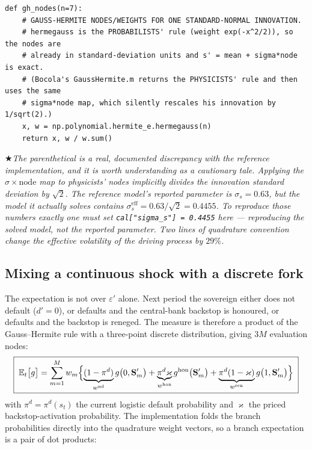 \documentclass[11pt]{article}
\numberwithin{equation}{section}
\newcommand{\E}{\mathbb{E}}
\newcommand{\code}[1]{\texttt{\small #1}}
\newcommand{\bS}{\mathbf{S}}
\theoremstyle{definition}
\theoremstyle{plain}
\theoremstyle{remark}
\newcommand{\warn}[1]{\par\smallskip\noindent
  \textcolor{red!60!black}{$\bigstar$}\;\emph{#1}\par\smallskip}
\begin{document}
\begin{lstlisting}[caption={Quadrature nodes. \code{point\_map.py}, \code{gh\_nodes}.}]
def gh_nodes(n=7):
    # GAUSS-HERMITE NODES/WEIGHTS FOR ONE STANDARD-NORMAL INNOVATION.
    # hermegauss is the PROBABILISTS' rule (weight exp(-x^2/2)), so the nodes are
    # already in standard-deviation units and s' = mean + sigma*node is exact.
    # (Bocola's GaussHermite.m returns the PHYSICISTS' rule and then uses the same
    # sigma*node map, which silently rescales his innovation by 1/sqrt(2).)
    x, w = np.polynomial.hermite_e.hermegauss(n)
    return x, w / w.sum()
\end{lstlisting}

\warn{The parenthetical is a real, documented discrepancy with the reference
implementation, and it is worth understanding as a cautionary tale. Applying the
$\sigma\times\text{node}$ map to physicists' nodes implicitly divides the innovation
standard deviation by $\sqrt2$. The reference model's \emph{reported} parameter is
$\sigma_s=0.63$, but the model it actually solves contains
$\sigma_s^{\text{eff}}=0.63/\sqrt2=0.4455$. To reproduce those numbers exactly one
must set \code{cal["sigma\_s"] = 0.4455} here --- reproducing the solved model, not
the reported parameter. Two lines of quadrature convention change the effective
volatility of the driving process by $29\%$.}

\subsection{Mixing a continuous shock with a discrete fork}

The expectation is not over $\varepsilon'$ alone. Next period the sovereign either
does not default ($d'=0$), or defaults and the central-bank backstop is honoured, or
defaults and the backstop is reneged. The measure is therefore a product of the
Gauss--Hermite rule with a three-point discrete distribution, giving $3M$ evaluation
nodes:
\begin{equation}
\boxed{\;
\E_t\bigl[g\bigr]=\sum_{m=1}^{M}w_m
\Bigl\{\underbrace{(1-\pi^{d})}_{w^{\rm nd}}g\bigl(0,\bS'_m\bigr)
+\underbrace{\pi^{d}\varkappa}_{w^{\rm hon}}g^{\rm hon}\bigl(\bS'_m\bigr)
+\underbrace{\pi^{d}(1-\varkappa)}_{w^{\rm ren}}g\bigl(1,\bS'_m\bigr)\Bigr\}\;}
\label{eq:three-branch}
\end{equation}
with $\pi^{d}=\pi^{d}(s_t)$ the current logistic default probability and $\varkappa$
the priced backstop-activation probability. The implementation folds the branch
probabilities directly into the quadrature weight vectors, so a branch expectation is
a pair of dot products:
\end{document}
